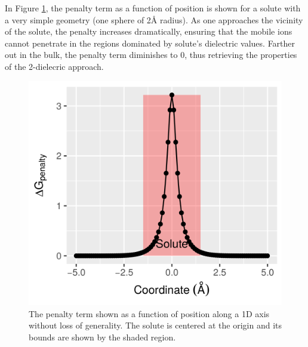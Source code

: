 \documentclass[9pt,tutorial]{livecoms}
\begin{document}
In Figure \ref{fig:plot_saltation_penalty}, the penalty term as a function of position is shown for a solute with a very simple geometry (one sphere of 2Å radius). As one approaches the vicinity of the solute, the penalty increases dramatically, ensuring that the mobile ions cannot penetrate in the regions dominated by solute’s dielectric values. Farther out in the bulk, the penalty term diminishes to 0, thus retrieving the properties of the 2-dielecric approach.

\begin{figure}[hbt!]
\includegraphics[width=\linewidth]{Figure_2.png}
\caption{The penalty term shown as a function of position along a 1D axis without loss of generality. The solute is centered at the origin and its bounds are shown by the shaded region.}
\label{fig:plot_saltation_penalty}
\end{figure}
\end{document}
